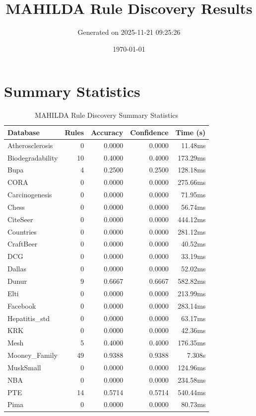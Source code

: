 \documentclass[11pt,a4paper]{article}
\title{MAHILDA Rule Discovery Results}
\author{Generated on 2025-11-21 09:25:26}
\date{\today}
\begin{document}
\maketitle

\section{Summary Statistics}
\begin{table}[h!]
\centering
\caption{MAHILDA Rule Discovery Summary Statistics}
\label{tab:mahilda_summary}
\begin{tabular}{|l|r|r|r|r|}
\hline
\textbf{Database} & \textbf{Rules} & \textbf{Accuracy} & \textbf{Confidence} & \textbf{Time (s)} \\
\hline
Atherosclerosis & 0 & 0.0000 & 0.0000 & 11.48ms \\
Biodegradability & 10 & 0.4000 & 0.4000 & 173.29ms \\
Bupa & 4 & 0.2500 & 0.2500 & 128.18ms \\
CORA & 0 & 0.0000 & 0.0000 & 275.66ms \\
Carcinogenesis & 0 & 0.0000 & 0.0000 & 71.95ms \\
Chess & 0 & 0.0000 & 0.0000 & 56.74ms \\
CiteSeer & 0 & 0.0000 & 0.0000 & 444.12ms \\
Countries & 0 & 0.0000 & 0.0000 & 281.12ms \\
CraftBeer & 0 & 0.0000 & 0.0000 & 40.52ms \\
DCG & 0 & 0.0000 & 0.0000 & 33.19ms \\
Dallas & 0 & 0.0000 & 0.0000 & 52.02ms \\
Dunur & 9 & 0.6667 & 0.6667 & 582.82ms \\
Elti & 0 & 0.0000 & 0.0000 & 213.99ms \\
Facebook & 0 & 0.0000 & 0.0000 & 283.14ms \\
Hepatitis_std & 0 & 0.0000 & 0.0000 & 63.17ms \\
KRK & 0 & 0.0000 & 0.0000 & 42.36ms \\
Mesh & 5 & 0.4000 & 0.4000 & 176.35ms \\
Mooney_Family & 49 & 0.9388 & 0.9388 & 7.308s \\
MuskSmall & 0 & 0.0000 & 0.0000 & 124.96ms \\
NBA & 0 & 0.0000 & 0.0000 & 234.58ms \\
PTE & 14 & 0.5714 & 0.5714 & 540.44ms \\
Pima & 0 & 0.0000 & 0.0000 & 80.73ms \\

\end{tabular}
\end{table}
\end{document}
